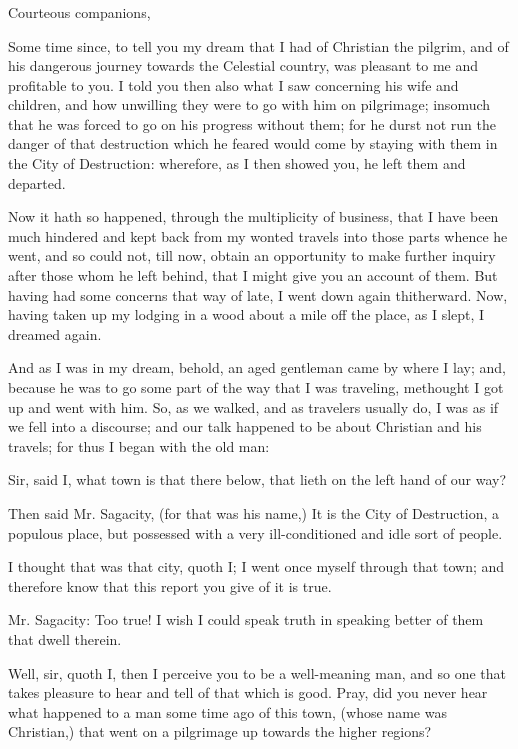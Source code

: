 \newpage
\subsubsection[INTRODUCTION]{}
Courteous companions,

Some time since, to tell you my dream that I had of Christian the pilgrim, and of his dangerous journey towards the Celestial country, was pleasant to me and profitable to you. I told you then also what I saw concerning his wife and children, and how unwilling they were to go with him on pilgrimage; insomuch that he was forced to go on his progress without them; for he durst not run the danger of that destruction which he feared would come by staying with them in the City of Destruction: wherefore, as I then showed you, he left them and departed.

Now it hath so happened, through the multiplicity of business, that I have been much hindered and kept back from my wonted travels into those parts whence he went, and so could not, till now, obtain an opportunity to make further inquiry after those whom he left behind, that I might give you an account of them. But having had some concerns that way of late, I went down again thitherward. Now, having taken up my lodging in a wood about a mile off the place, as I slept, I dreamed again.

And as I was in my dream, behold, an aged gentleman came by where I lay; and, because he was to go some part of the way that I was traveling, methought I got up and went with him. So, as we walked, and as travelers usually do, I was as if we fell into a discourse; and our talk happened to be about Christian and his travels; for thus I began with the old man:

Sir, said I, what town is that there below, that lieth on the left hand of our way?

Then said Mr. Sagacity, (for that was his name,) It is the City of Destruction, a populous place, but possessed with a very ill-conditioned and idle sort of people.

I thought that was that city, quoth I; I went once myself through that town; and therefore know that this report you give of it is true.

Mr. Sagacity: Too true! I wish I could speak truth in speaking better of them that dwell therein.

Well, sir, quoth I, then I perceive you to be a well-meaning man, and so one that takes pleasure to hear and tell of that which is good. Pray, did you never hear what happened to a man some time ago of this town, (whose name was Christian,) that went on a pilgrimage up towards the higher regions?

